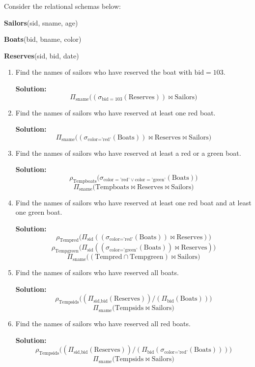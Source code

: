 \begin{eg}
  Consider the relational schemas below:

  \textbf{Sailors}(sid, sname, age)
  
  \textbf{Boats}(bid, bname, color)
  
  \textbf{Reserves}(sid, bid, date)

  \begin{enumerate}
    \item Find the names of sailors who have reserved the boat with \(\text{bid} = 103\).
    
    \textbf{Solution:}
    \[
      \Pi_{\text{sname}} \big( (\sigma_{\text{bid} = 103} (\text{Reserves})) \Join \text{Sailors} \big)
    \]

    \item Find the names of sailors who have reserved at least one red boat.
    
    \textbf{Solution:}
    \[
      \Pi_{\text{sname}} \big( (\sigma_{\text{color} = \text{'red'}} (\text{Boats})) \Join \text{Reserves} \Join \text{Sailors} \big)
    \]

    \item Find the names of sailors who have reserved at least a red or a green boat.
    
    \textbf{Solution:}
    \[
      \rho_{\text{Tempboats}} \big( \sigma_{\text{color} = \text{'red'} \lor \text{color} = \text{'green'}} (\text{Boats}) \big)
    \]
    \[
      \Pi_{\text{sname}} \big( \text{Tempboats} \Join \text{Reserves} \Join \text{Sailors} \big)
    \]

    \item Find the names of sailors who have reserved at least one red boat and at least one green boat.
    
    \textbf{Solution:}
    \[
      \rho_{\text{Tempred}} \big( \Pi_{\text{sid}} ( (\sigma_{\text{color} = \text{'red'}} (\text{Boats})) \Join \text{Reserves} ) \big)
    \]
    \[
      \rho_{\text{Tempgreen}} \big( \Pi_{\text{sid}} ( (\sigma_{\text{color} = \text{'green'}} (\text{Boats})) \Join \text{Reserves} ) \big)
    \]
    \[
      \Pi_{\text{sname}} \big( (\text{Tempred} \cap \text{Tempgreen}) \Join \text{Sailors} \big)
    \]

    \item Find the names of sailors who have reserved all boats.
    
    \textbf{Solution:}
    \[
      \rho_{\text{Tempsids}} \big( (\Pi_{\text{sid}, \text{bid}} (\text{Reserves})) / (\Pi_{\text{bid}} (\text{Boats})) \big)
    \]
    \[
      \Pi_{\text{sname}} \big( \text{Tempsids} \Join \text{Sailors} \big)
    \]

    \item Find the names of sailors who have reserved all red boats.
    
    \textbf{Solution:}
    \[
      \rho_{\text{Tempsids}} \big( (\Pi_{\text{sid}, \text{bid}} (\text{Reserves})) / (\Pi_{\text{bid}} (\sigma_{\text{color} = \text{'red'}} (\text{Boats}))) \big)
    \]
    \[
      \Pi_{\text{sname}} \big( \text{Tempsids} \Join \text{Sailors} \big)
    \]
  \end{enumerate}
\end{eg}


